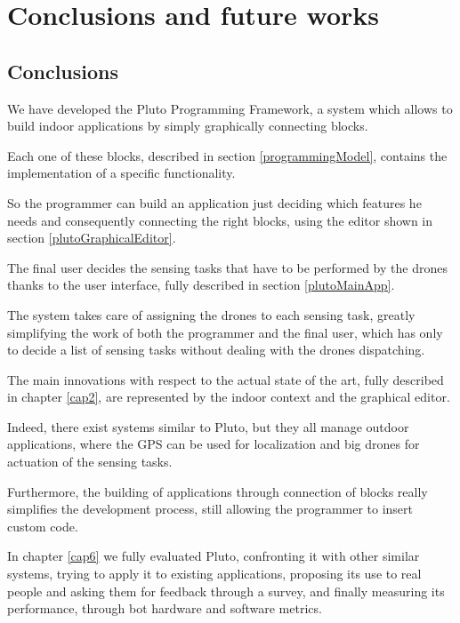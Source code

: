 \chapter{Conclusions and future works}
\label{cap7}


\section{Conclusions}

We have developed the Pluto Programming Framework, a system which allows to build indoor applications by simply graphically connecting blocks.

Each one of these blocks, described in section \ref{programmingModel}, contains the implementation of a specific functionality.

So the programmer can build an application just deciding which features he needs and consequently connecting the right blocks, using the editor shown in section \ref{plutoGraphicalEditor}.

The final user decides the sensing tasks that have to be performed by the drones thanks to the user interface, fully described in section \ref{plutoMainApp}.

The system takes care of assigning the drones to each sensing task, greatly simplifying the work of both the programmer and the final user, which has only to decide a list of sensing tasks without dealing with the drones dispatching. 

The main innovations with respect to the actual state of the art, fully described in chapter \ref{cap2}, are represented by the indoor context and the graphical editor.

Indeed, there exist systems similar to Pluto, but they all manage outdoor applications, where the GPS can be used for localization and big drones for actuation of the sensing tasks.

Furthermore, the building of applications through connection of blocks really simplifies the development process, still allowing the programmer to insert custom code.

In chapter \ref{cap6} we fully evaluated Pluto, confronting it with other similar systems, trying to apply it to existing applications, proposing its use to real people and asking them for feedback through a survey, and finally measuring its performance, through bot hardware and software metrics.


